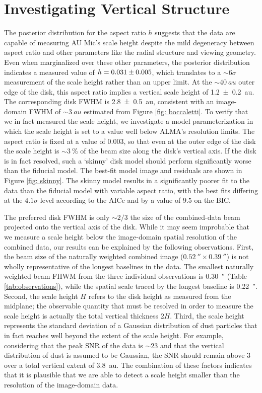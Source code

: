 \documentclass[12pt,oneside]{book}
\begin{document}
\section{Investigating Vertical Structure}
\label{section: vertical analysis}

The posterior distribution for the aspect ratio $h$ suggests that the data are capable of measuring AU Mic's scale height despite the mild degeneracy between aspect ratio and other parameters like the radial structure and viewing geometry.  
Even when marginalized over these other parameters, the posterior distribution indicates a measured value of $h=\num{0.031 \pm 0.005}$, which translates to a $\sim 6 \sigma$ measurement of the scale height rather than an upper limit.
At the $\sim \SI{40}{au}$ outer edge of the disk, this aspect ratio implies a vertical scale height of \SI{1.2 \pm 0.2}{au}. 
The corresponding disk FWHM is \SI{2.8 \pm 0.5}{au}, consistent with an image-domain FWHM of $\sim \SI{3}{au}$ estimated from Figure \ref{fig: boccaletti}.
To verify that we in fact measured the scale height, we investigate a model parameterization in which the scale height is set to a value well below ALMA's resolution limits.
The aspect ratio is fixed at a value of $0.003$, so that even at the outer edge of the disk the scale height is $\sim \SI{3}{\percent}$ of the beam size along the disk's vertical axis.
If the disk is in fact resolved, such a `skinny' disk model should perform significantly worse than the fiducial model.
The best-fit model image and residuals are shown in Figure \ref{fig: skinny}.
The skinny model results in a significantly poorer fit to the data than the fiducial model with variable aspect ratio, with the best fits differing at the $4.1\sigma$ level according to the AICc and by a value of 9.5 on the BIC.

The preferred disk FWHM is only $\sim 2/3$ the size of the combined-data beam projected onto the vertical axis of the disk.
While it may seem improbable that we measure a scale height below the image-domain spatial resolution of the combined data, our results can be explained by the following observations.
First, the beam size of the naturally weighted combined image ($\SI{0.52}{\arcsecond} \times \SI{0.39}{\arcsecond}$) is not wholly representative of the longest baselines in the data. 
The smallest naturally weighted beam FHWM from the three individual observations is \SI{0.30}{\arcsecond} (Table \ref{tab:observations}), while the spatial scale traced by the longest baseline is \SI{0.22}{\arcsecond}.
Second, the scale height $H$ refers to the disk height as measured from the midplane; the observable quantity that must be resolved in order to measure the scale height is actually the total vertical thickness $2H$.
Third, the scale height represents the standard deviation of a Gaussian distribution of dust particles that in fact reaches well beyond the extent of the scale height.
For example, considering that the peak SNR of the data is $\sim 23$ and that the vertical distribution of dust is assumed to be Gaussian, the SNR should remain above 3 over a total vertical extent of \SI{3.8}{au}. 
The combination of these factors indicates that it is plausible that we are able to detect a scale height smaller than the resolution of the image-domain data.
\end{document}
